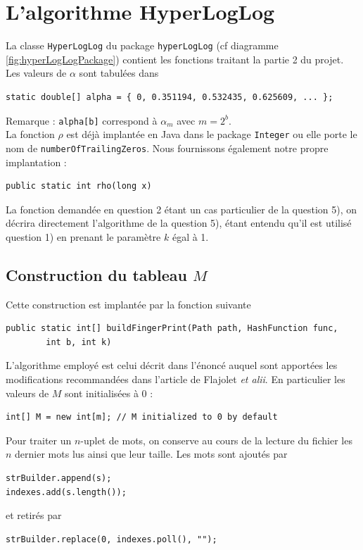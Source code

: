 \documentclass[12pt,a4paper,titlepage]{article}
\newcommand{\class}[1]{\texttt{#1}}
\begin{document}
\newpage
\section{L'algorithme HyperLogLog}
La classe \class{HyperLogLog} du package \class{hyperLogLog} (cf diagramme \ref{fig:hyperLogLogPackage}) contient les fonctions traitant la partie 2 du projet.\\

Les valeurs de $\alpha$ sont tabulées dans 
\begin{lstlisting}
static double[] alpha = { 0, 0.351194, 0.532435, 0.625609, ... };
\end{lstlisting}
Remarque : \class{alpha[b]} correspond à $\alpha_m$ avec $m=2^b$.\\

La fonction $\rho$ est déjà implantée en Java dans le package \class{Integer} ou elle porte le nom de \class{numberOfTrailingZeros}.
Nous fournissons également notre propre implantation :
\begin{lstlisting}
public static int rho(long x)
\end{lstlisting}

La fonction demandée en question 2 étant un cas particulier de la question 5), on décrira directement l'algorithme de la question 5), étant entendu qu'il est utilisé question 1) en prenant le paramètre $k$ égal à 1.

\subsection{Construction du tableau $M$}
Cette construction est implantée par la fonction suivante
\begin{lstlisting}
public static int[] buildFingerPrint(Path path, HashFunction func,
		int b, int k)
\end{lstlisting}
L'algorithme employé est celui décrit dans l'énoncé auquel sont apportées les modifications recommandées dans l'article de Flajolet \textit{et alii}.
En particulier les valeurs de $M$ sont initialisées à $0$ :
\begin{lstlisting}
int[] M = new int[m]; // M initialized to 0 by default
\end{lstlisting}

Pour traiter un $n$-uplet de mots, on conserve au cours de la lecture du fichier les $n$ dernier mots lus ainsi que leur taille.
Les mots sont ajoutés par
\begin{lstlisting}
strBuilder.append(s);
indexes.add(s.length());
\end{lstlisting}
et retirés par
\begin{lstlisting}
strBuilder.replace(0, indexes.poll(), "");
\end{lstlisting}
\end{document}
